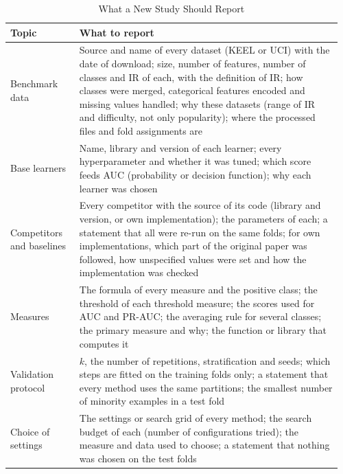 \begin{table}[p]
  \caption{What a New Study Should Report}
  \label{tab:empirical-checklist}
  \footnotesize
  \setlength{\tabcolsep}{4pt}
  \begin{tabular}{@{}>{\raggedright\arraybackslash}p{0.2\linewidth}>{\raggedright\arraybackslash}p{0.76\linewidth}@{}}
    \toprule
    Topic & What to report\\
    \midrule
    Benchmark data & Source and name of every dataset (KEEL or UCI) with the date of download; size, number of features, number of classes and IR of each, with the definition of IR; how classes were merged, categorical features encoded and missing values handled; why these datasets (range of IR and difficulty, not only popularity); where the processed files and fold assignments are\\
    Base learners & Name, library and version of each learner; every hyperparameter and whether it was tuned; which score feeds AUC (probability or decision function); why each learner was chosen\\
    Competitors and baselines & Every competitor with the source of its code (library and version, or own implementation); the parameters of each; a statement that all were re-run on the same folds; for own implementations, which part of the original paper was followed, how unspecified values were set and how the implementation was checked\\
    Measures & The formula of every measure and the positive class; the threshold of each threshold measure; the scores used for AUC and PR-AUC; the averaging rule for several classes; the primary measure and why; the function or library that computes it\\
    Validation protocol & $k$, the number of repetitions, stratification and seeds; which steps are fitted on the training folds only; a statement that every method uses the same partitions; the smallest number of minority examples in a test fold\\
    Choice of settings & The settings or search grid of every method; the search budget of each (number of configurations tried); the measure and data used to choose; a statement that nothing was chosen on the test folds\\

\end{tabular}
\end{table}
